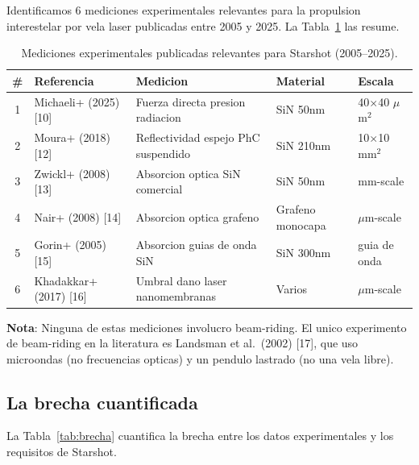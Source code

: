 \documentclass[11pt,a4paper,onecolumn]{article}
\begin{document}
Identificamos 6 mediciones experimentales relevantes para la propulsion interestelar por vela laser publicadas entre 2005 y 2025. La Tabla~\ref{tab:mediciones} las resume.

\begin{table}[h]
\centering
\caption{Mediciones experimentales publicadas relevantes para Starshot (2005--2025).}
\label{tab:mediciones}
\begin{tabular}{cllll}
\hline
\textbf{\#} & \textbf{Referencia} & \textbf{Medicion} & \textbf{Material} & \textbf{Escala} \\
\hline
1 & Michaeli+ (2025) [10] & Fuerza directa presion radiacion & SiN 50nm & 40$\times$40 $\mu$m$^2$ \\
2 & Moura+ (2018) [12] & Reflectividad espejo PhC suspendido & SiN 210nm & 10$\times$10 mm$^2$ \\
3 & Zwickl+ (2008) [13] & Absorcion optica SiN comercial & SiN 50nm & mm-scale \\
4 & Nair+ (2008) [14] & Absorcion optica grafeno & Grafeno monocapa & $\mu$m-scale \\
5 & Gorin+ (2005) [15] & Absorcion guias de onda SiN & SiN 300nm & guia de onda \\
6 & Khadakkar+ (2017) [16] & Umbral dano laser nanomembranas & Varios & $\mu$m-scale \\
\hline
\end{tabular}
\end{table}

\textbf{Nota}: Ninguna de estas mediciones involucro beam-riding. El unico experimento de beam-riding en la literatura es Landsman et al.\ (2002) [17], que uso microondas (no frecuencias opticas) y un pendulo lastrado (no una vela libre).

\subsection{La brecha cuantificada}

La Tabla~\ref{tab:brecha} cuantifica la brecha entre los datos experimentales y los requisitos de Starshot.
\end{document}
